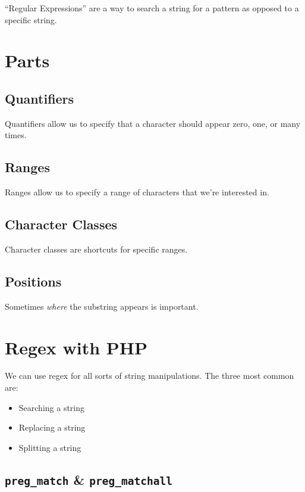 ``Regular Expressions'' are a way to search a string for a pattern as opposed to a specific string.

\section{Parts}


\subsection{Quantifiers}

Quantifiers allow us to specify that a character should appear zero, one, or many times.


\subsection{Ranges}

Ranges allow us to specify a range of characters that we're interested in.


\subsection{Character Classes}

Character classes are shortcuts for specific ranges.


\subsection{Positions}

Sometimes \textit{where} the substring appears is important.

\pagebreak


\section{Regex with PHP}

We can use regex for all sorts of string manipulations. The three most common are:

\begin{itemize}
    \item Searching a string
    \item Replacing a string
    \item Splitting a string
\end{itemize}

\subsection{\texttt{preg\_match} \& \texttt{preg\_matchall}}

